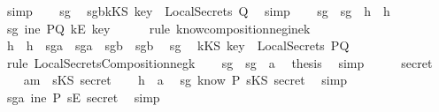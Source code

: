 \begin{isabellebody}
\ simp\isanewline
\ \ \isamarkupfalse%
\ sg{}\ \isamarkupfalse%
\ sg{}b{\isacharcolon}{\isachardoublequoteopen}kKS\ key\ {\isasymnotin}\ LocalSecrets\ Q{\isachardoublequoteclose}\ \isamarkupfalse%
\ simp\isanewline
\ \ \isamarkupfalse%
\ sg{}\ \ sg{}\ \ h{}\ \ h{}\ \isamarkupfalse%
\ sg{}{\isacharcolon}{\isachardoublequoteopen}{\isasymnot}\ ine\ PQ\ {\isacharparenleft}kE\ key{\isacharparenright}{\isachardoublequoteclose}\isanewline
\ \ \ \ \isamarkupfalse%
\ {\isacharparenleft}rule\ know{\isacharunderscore}composition{\isacharunderscore}neg{\isacharunderscore}ine{\isacharunderscore}k{\isacharparenright}\isanewline
\ \ \isamarkupfalse%
\ h{}\ \ h{}\ \ sg{}a\ \ sg{}a\ \ sg{}b\ \ sg{}b\ \isamarkupfalse%
\ sg{}{\isacharcolon}\isanewline
\ \ {\isachardoublequoteopen}kKS\ key\ {\isasymnotin}\ LocalSecrets\ PQ{\isachardoublequoteclose}\ \isanewline
\ \ \ \ \isamarkupfalse%
\ {\isacharparenleft}rule\ LocalSecretsComposition{\isacharunderscore}neg{}{\isacharunderscore}k{\isacharparenright}\isanewline
\ \ \isamarkupfalse%
\ sg{}\ \ sg{}\ \ a{}\ \isamarkupfalse%
\ {\isacharquery}thesis\ \isamarkupfalse%
\ simp\isanewline
{}\isamarkupfalse%
\ \isanewline
\ \ \isamarkupfalse%
\ secret\isanewline
\ \ \isamarkupfalse%
\ a{}{\isacharcolon}{\isachardoublequoteopen}m\ {\isacharequal}\ sKS\ secret{\isachardoublequoteclose}\isanewline
\ \ \isamarkupfalse%
\ h{}\ \ a{}\ \isamarkupfalse%
\ sg{}{\isacharcolon}{\isachardoublequoteopen}{\isasymnot}\ know\ P\ {\isacharparenleft}sKS\ secret{\isacharparenright}{\isachardoublequoteclose}\ \isamarkupfalse%
\ simp\isanewline
\ \ \isamarkupfalse%
\ \isamarkupfalse%
\ sg{}a{\isacharcolon}{\isachardoublequoteopen}{\isasymnot}\ ine\ P\ {\isacharparenleft}sE\ secret{\isacharparenright}{\isachardoublequoteclose}\ \isamarkupfalse%
\ simp\isanewline
\ \ \isamarkupfalse%

\end{isabellebody}
